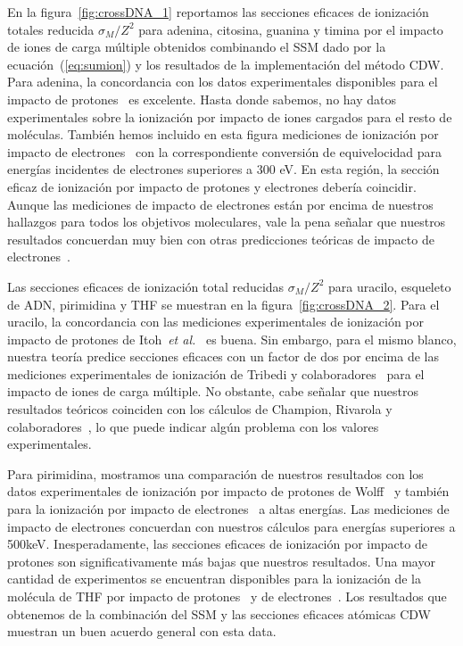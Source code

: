 En la figura~\ref{fig:crossDNA_1} reportamos las secciones eficaces de 
ionización totales reducida $\sigma_M/Z^2$ para adenina, citosina, 
guanina y timina por el impacto de iones de carga múltiple obtenidos 
combinando el SSM dado por la ecuación~(\ref{eq:sumion}) y los 
resultados de la implementación del método CDW. Para adenina, la 
concordancia con los datos experimentales disponibles para el impacto 
de protones~\cite{iriki2011} es excelente. Hasta donde sabemos, no hay 
datos experimentales sobre la ionización por impacto de iones cargados 
para el resto de moléculas. También hemos incluido en esta figura 
mediciones de ionización por impacto de electrones~\cite{rahman2016} 
con la correspondiente conversión de equivelocidad para energías 
incidentes de electrones superiores a 300 eV. En esta región, la 
sección eficaz de ionización por impacto de protones y electrones 
debería coincidir. Aunque las mediciones de impacto de electrones están 
por encima de nuestros hallazgos para todos los objetivos moleculares, 
vale la pena señalar que nuestros resultados concuerdan muy bien con 
otras predicciones teóricas de impacto de 
electrones~\cite{mozejko2003,tan2018}. 

Las secciones eficaces de ionización total reducidas $\sigma_M/Z^2$ 
para uracilo, esqueleto de ADN, pirimidina y THF se muestran en la 
figura~\ref{fig:crossDNA_2}. Para el uracilo, la concordancia con las 
mediciones experimentales de ionización por impacto de protones de 
Itoh~\textit{et al.}~\cite{itoh2013} es buena. Sin embargo, para el 
mismo blanco, nuestra teoría predice secciones eficaces con un factor 
de dos por encima de las mediciones experimentales de ionización de 
Tribedi y colaboradores~\cite{agnihotri2012,agnihotri2013} para el 
impacto de iones de carga múltiple. No obstante, cabe señalar que 
nuestros resultados teóricos coinciden con los cálculos de Champion, 
Rivarola y colaboradores~\cite{agnihotri2012,champion2012}, lo que 
puede indicar algún problema con los valores experimentales.


Para pirimidina, mostramos una comparación de nuestros resultados con 
los datos experimentales de ionización por impacto de protones de 
Wolff~\cite{wolff2014} y también para la ionización por impacto de 
electrones~\cite{bug2017} a altas energías. Las mediciones de impacto 
de electrones concuerdan con nuestros cálculos para energías superiores 
a 500keV. Inesperadamente, las secciones eficaces de ionización por 
impacto de protones son significativamente más bajas que nuestros 
resultados. Una mayor cantidad de experimentos se encuentran disponibles 
para la ionización de la molécula de THF por impacto de 
protones~\cite{wang2016} y de electrones~\cite{bug2017,wolf2019,fuss2009}. 
Los resultados que obtenemos de la combinación del SSM y las secciones
eficaces atómicas CDW muestran un buen acuerdo general con esta data.

